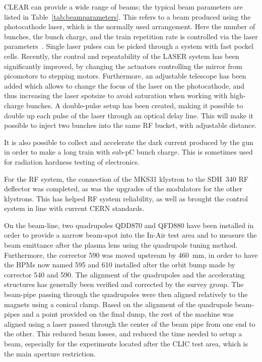 \documentclass[a4paper,
               keeplastbox,   %
               ]{jacow}
\begin{document}
CLEAR can provide a wide range of beams; the typical beam parameters are listed in Table~\ref{tab:beamparameters}.
This refers to a beam produced using the photocathode laser, which is the normally used arrangement.
Here the number of bunches, the bunch charge, and the train repetition rate is controlled via the laser parameters~\cite{LucaGun,BrossardGun}.
Single laser pulses can be picked through a system with fast pockel cells.
Recently, the control and repeatability of the LASER system has been significantly improved, by changing the actuators controlling the mirror from picomotors to stepping motors.
Furthermore, an adjustable telescope has been added which allows to change the focus of the laser on the photocathode, and thus increasing the laser spotsize to avoid saturation when working with high-charge bunches.
A double-pulse setup has been created, making it possible to double up each pulse of the laser through an optical delay line.
This will make it possible to inject two bunches into the same RF bucket, with adjustable distance.

It is also possible to collect and accelerate the dark current produced by the gun in order to make a long train with sub-pC bunch charge.
This is sometimes used for radiation hardness testing of electronics.

For the RF system, the connection of the MKS31 klystron to the SDH~340 RF deflector was completed, as was the upgrades of the modulators for the other klystrons.
This has helped RF system reliability, as well as brought the control system in line with current CERN standards.


On the beam-line, two quadrupoles QDD870 and QFD880 have been installed in order to provide a narrow beam-spot into the In-Air test area and to measure the beam emittance after the plasma lens using the quadrupole tuning method.
Furthermore, the corrector 590 was moved upstream by 460~mm, in order to have the BPMs now named 595 and 610 installed after the orbit bump made by corrector 540 and 590.
The alignment of the quadrupoles and the accelerating structures has generally been verified and corrected by the survey group.
The beam-pipe passing through the quadrupoles were then aligned relatively to the magnets using a conical clamp.
Based on the alignment of the quadrupole beam-pipes and a point provided on the final dump, the rest of the machine was aligned using a laser passed through the center of the beam pipe from one end to the other.
This reduced beam losses, and reduced the time needed to setup a beam, especially for the experiments located after the CLIC test area, which is the main aperture restriction.
\end{document}
